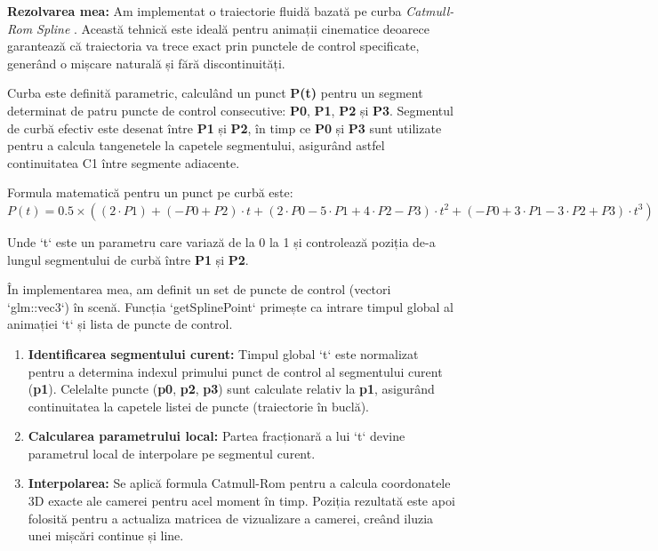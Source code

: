 \documentclass[11pt,a4paper]{article}
\begin{document}
\textbf{Rezolvarea mea:} Am implementat o traiectorie fluidă bazată pe curba \textit{Catmull-Rom Spline} \cite{catmullrom}. Această tehnică este ideală pentru animații cinematice deoarece garantează că traiectoria va trece exact prin punctele de control specificate, generând o mișcare naturală și fără discontinuități.

Curba este definită parametric, calculând un punct \textbf{P(t)} pentru un segment determinat de patru puncte de control consecutive: \textbf{P0}, \textbf{P1}, \textbf{P2} și \textbf{P3}. Segmentul de curbă efectiv este desenat între \textbf{P1} și \textbf{P2}, în timp ce \textbf{P0} și \textbf{P3} sunt utilizate pentru a calcula tangenetele la capetele segmentului, asigurând astfel continuitatea C1 între segmente adiacente.

Formula matematică pentru un punct pe curbă este:
$P(t) = 0.5 \times ((2 \cdot P1) + (-P0 + P2) \cdot t + (2 \cdot P0 - 5 \cdot P1 + 4 \cdot P2 - P3) \cdot t^2 + (-P0 + 3 \cdot P1 - 3 \cdot P2 + P3) \cdot t^3)$

Unde `t` este un parametru care variază de la 0 la 1 și controlează poziția de-a lungul segmentului de curbă între \textbf{P1} și \textbf{P2}.

În implementarea mea, am definit un set de puncte de control (vectori `glm::vec3`) în scenă. Funcția `getSplinePoint` primește ca intrare timpul global al animației `t` și lista de puncte de control.

\begin{enumerate}
    \item \textbf{Identificarea segmentului curent:} Timpul global `t` este normalizat pentru a determina indexul primului punct de control al segmentului curent (\textbf{p1}). Celelalte puncte (\textbf{p0}, \textbf{p2}, \textbf{p3}) sunt calculate relativ la \textbf{p1}, asigurând continuitatea la capetele listei de puncte (traiectorie în buclă).
    
    \item \textbf{Calcularea parametrului local:} Partea fracționară a lui `t` devine parametrul local de interpolare pe segmentul curent.
    
    \item \textbf{Interpolarea:} Se aplică formula Catmull-Rom pentru a calcula coordonatele 3D exacte ale camerei pentru acel moment în timp. Poziția rezultată este apoi folosită pentru a actualiza matricea de vizualizare a camerei, creând iluzia unei mișcări continue și line.
\end{enumerate}
\end{document}
